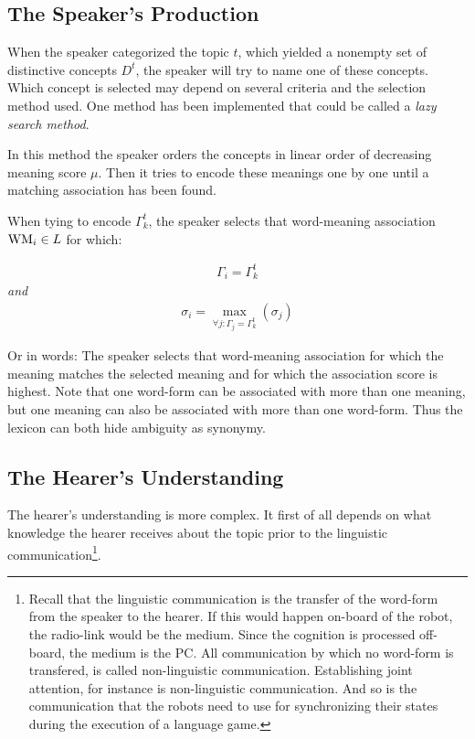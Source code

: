 \subsection{The Speaker's Production}\label{s:cm:production}

When the speaker categorized the topic $t$, which yielded a nonempty set of distinctive concepts $D^t$, the speaker will try to name one of these concepts. Which concept is selected may depend on several criteria and the selection method used. One method has been implemented that could be called a {\em lazy search method}.

\p
In this method the speaker orders the concepts in linear order of decreasing meaning score $\mu$. Then it tries to encode these meanings one by one until a matching association has been found.

When tying to encode $\Gamma^t_k$, the speaker selects that word-meaning association ${\bf \mbox{WM}}_i \in L$ for which:

\begin{eqnarray}
\Gamma_{i}=\Gamma^t_k\nonumber
\end{eqnarray}
\noindent
{\em and}
\begin{eqnarray}
\sigma_i = \max_{\forall j:\Gamma_{j}=\Gamma^t_k} (\sigma_j)
\label{e:select}
\end{eqnarray}

\noindent
Or in words: The speaker selects that word-meaning association for which the meaning matches the selected meaning and for which the association score is highest. Note that one word-form can be associated with more than one meaning, but one meaning can also be associated with more than one word-form. Thus the lexicon can both hide ambiguity as synonymy.

\subsection{The Hearer's Understanding}\label{s:cm:understanding}

The hearer's understanding is more complex. It first of all depends on what knowledge the hearer receives about the topic prior to the linguistic communication\footnote{Recall that the linguistic communication is the transfer of the word-form from the speaker to the hearer. If this would happen on-board of the robot, the radio-link would be the medium. Since the cognition is processed off-board, the medium is the PC. All communication by which no word-form is transfered, is called non-linguistic communication. Establishing joint attention, for instance is non-linguistic communication. And so is the communication that the robots need to use for synchronizing their states during the execution of a language game.}. 

